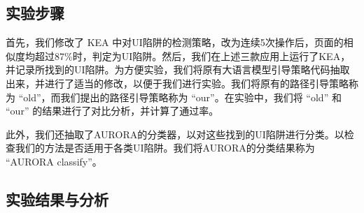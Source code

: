 \documentclass{article}
\begin{document}
\subsection{实验步骤}

首先，我们修改了 K{\small\MakeUppercase{ea}} 中对UI陷阱的检测策略，改为连续5次操作后，页面的相似度均超过87\%时，判定为UI陷阱。然后，我们在上述三款应用上运行了K{\small\MakeUppercase{ea}}，并记录所找到的UI陷阱。为方便实验，我们将原有大语言模型引导策略代码抽取出来，并进行了适当的修改，以便于我们进行实验。我们将原有的路径引导策略称为 ``old''，而我们提出的路径引导策略称为 ``our''。在实验中，我们将 ``old'' 和 ``our'' 的结果进行了对比分析，并计算了通过率。

此外，我们还抽取了AURORA的分类器，以对这些找到的UI陷阱进行分类。以检查我们的方法是否适用于各类UI陷阱。我们将AURORA的分类结果称为 ``AURORA classify''。

\subsection{实验结果与分析}
\end{document}
